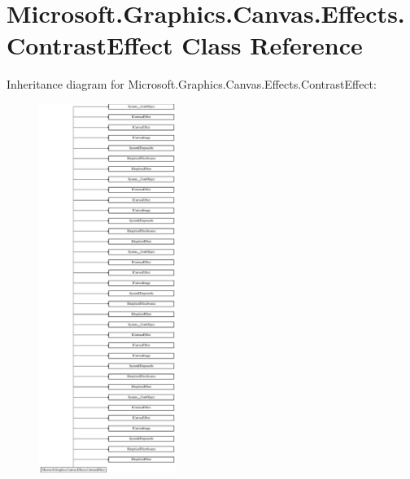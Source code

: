 \hypertarget{class_microsoft_1_1_graphics_1_1_canvas_1_1_effects_1_1_contrast_effect}{}\section{Microsoft.\+Graphics.\+Canvas.\+Effects.\+Contrast\+Effect Class Reference}
\label{class_microsoft_1_1_graphics_1_1_canvas_1_1_effects_1_1_contrast_effect}
Inheritance diagram for Microsoft.\+Graphics.\+Canvas.\+Effects.\+Contrast\+Effect\+:\begin{figure}[H]
\begin{center}
\leavevmode
\includegraphics[height=12.000000cm]{class_microsoft_1_1_graphics_1_1_canvas_1_1_effects_1_1_contrast_effect}
\end{center}
\end{figure}
